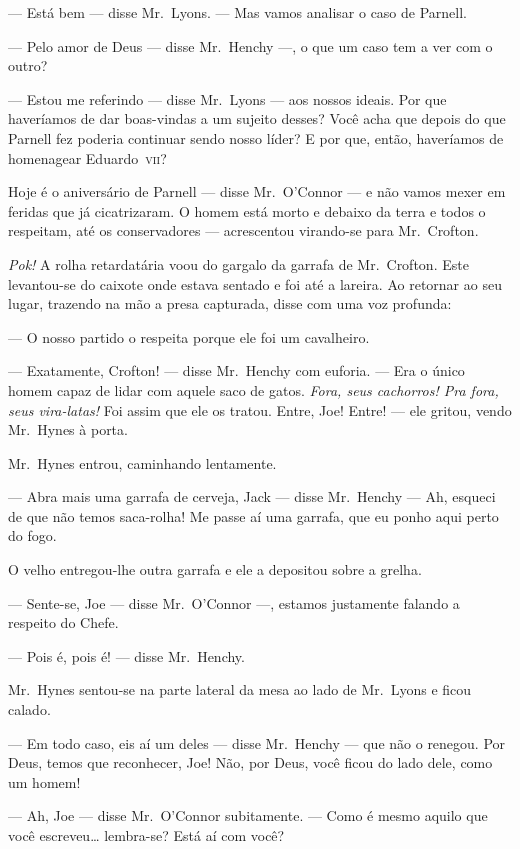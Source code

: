 --- Está bem --- disse Mr.~Lyons.  --- Mas vamos analisar o caso de Parnell.

--- Pelo amor de Deus --- disse Mr.~Henchy ---, o que um caso tem a ver com o
outro?

--- Estou me referindo --- disse Mr.~Lyons --- aos nossos ideais.  Por que
haveríamos de dar boas-vindas a um sujeito desses?  Você acha que depois do que
Parnell fez poderia continuar sendo nosso líder?  E por que, então, haveríamos
de homenagear Eduardo~\textsc{vii}?

Hoje é o aniversário de Parnell --- disse Mr.~O’Connor --- e não vamos mexer em
feridas que já cicatrizaram.  O homem está morto e debaixo da terra e todos o
respeitam, até os conservadores --- acrescentou virando-se para Mr.~Crofton.

\textit{Pok!} A rolha retardatária voou do gargalo da garrafa de Mr.~Crofton.
Este levantou-se do caixote onde estava sentado e foi até a lareira.  Ao
retornar ao seu lugar, trazendo na mão a presa capturada, disse com uma voz
profunda:

--- O nosso partido o respeita porque ele foi um cavalheiro.

--- Exatamente, Crofton! --- disse Mr.~Henchy com euforia.  --- Era o único
homem capaz de lidar com aquele saco de gatos.  \textit{Fora, seus cachorros!
Pra fora, seus vira-latas!} Foi assim que ele os tratou.  Entre, Joe!  Entre!
--- ele gritou, vendo Mr.~Hynes à porta.

Mr.~Hynes entrou, caminhando lentamente.

--- Abra mais uma garrafa de cerveja, Jack --- disse Mr.~Henchy --- Ah, esqueci
de que não temos saca-rolha! Me passe aí uma garrafa, que eu ponho aqui perto
do fogo.

O velho entregou-lhe outra garrafa e ele a depositou sobre a grelha.

--- Sente-se, Joe --- disse Mr.~O’Connor ---, estamos justamente falando a
respeito do Chefe.

--- Pois é, pois é! --- disse Mr.~Henchy.

Mr.~Hynes sentou-se na parte lateral da mesa ao lado de Mr.~Lyons e ficou
calado.

--- Em todo caso, eis aí um deles --- disse Mr.~Henchy --- que não o renegou.
Por Deus, temos que reconhecer, Joe!  Não, por Deus, você ficou do lado dele,
como um homem!

--- Ah, Joe --- disse Mr.~O’Connor subitamente.  --- Como é mesmo aquilo que
você escreveu\ldots{} lembra-se?  Está aí com você?

